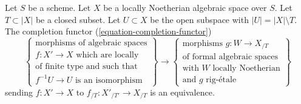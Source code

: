 \begin{theorem}
\label{theorem-dilatations-general}
Let $S$ be a scheme. Let $X$ be a locally Noetherian algebraic space over $S$.
Let $T \subset |X|$ be a closed subset. Let $U \subset X$ be the open subspace
with $|U| = |X| \setminus T$. The completion functor
(\ref{equation-completion-functor})
$$
\left\{
\begin{matrix}
\text{morphisms of algebraic spaces}\\
f : X' \to X\text{ which are locally}\\
\text{of finite type and such that}\\
f^{-1}U \to U\text{ is an isomorphism}
\end{matrix}
\right\}
\longrightarrow
\left\{
\begin{matrix}
\text{morphisms }g : W \to X_{/T}\\
\text{of formal algebraic spaces}\\
\text{with }W\text{ locally Noetherian}\\
\text{and }g\text{ rig-\'etale}
\end{matrix}
\right\}
$$
sending $f : X' \to X$ to $f_{/T} : X'_{/T'} \to X_{/T}$ is an equivalence.
\end{theorem}

